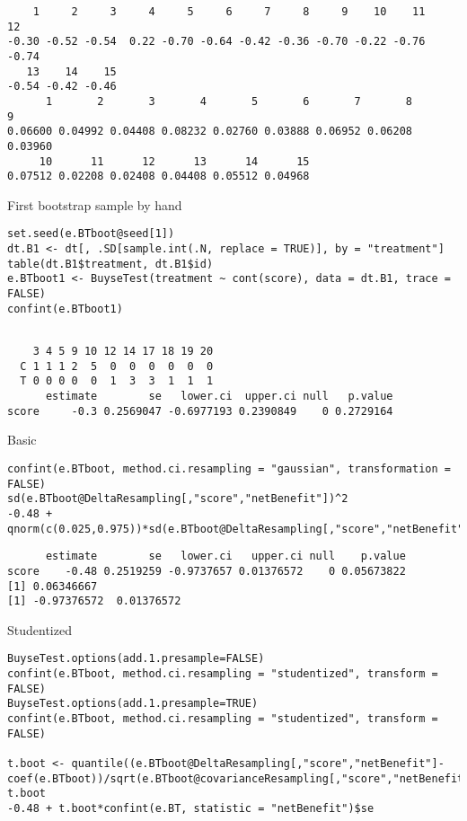 \documentclass[12pt]{article}
\begin{document}
\begin{verbatim}
    1     2     3     4     5     6     7     8     9    10    11    12 
-0.30 -0.52 -0.54  0.22 -0.70 -0.64 -0.42 -0.36 -0.70 -0.22 -0.76 -0.74 
   13    14    15 
-0.54 -0.42 -0.46
      1       2       3       4       5       6       7       8       9 
0.06600 0.04992 0.04408 0.08232 0.02760 0.03888 0.06952 0.06208 0.03960 
     10      11      12      13      14      15 
0.07512 0.02208 0.02408 0.04408 0.05512 0.04968
\end{verbatim}


First bootstrap sample by hand
\lstset{language=r,label= ,caption= ,captionpos=b,numbers=none}
\begin{lstlisting}
set.seed(e.BTboot@seed[1])
dt.B1 <- dt[, .SD[sample.int(.N, replace = TRUE)], by = "treatment"]
table(dt.B1$treatment, dt.B1$id)
e.BTboot1 <- BuyseTest(treatment ~ cont(score), data = dt.B1, trace = FALSE)
confint(e.BTboot1)
\end{lstlisting}

\begin{verbatim}
   
    3 4 5 9 10 12 14 17 18 19 20
  C 1 1 1 2  5  0  0  0  0  0  0
  T 0 0 0 0  0  1  3  3  1  1  1
      estimate        se   lower.ci  upper.ci null   p.value
score     -0.3 0.2569047 -0.6977193 0.2390849    0 0.2729164
\end{verbatim}


Basic
\lstset{language=r,label= ,caption= ,captionpos=b,numbers=none}
\begin{lstlisting}
confint(e.BTboot, method.ci.resampling = "gaussian", transformation = FALSE) 
sd(e.BTboot@DeltaResampling[,"score","netBenefit"])^2
-0.48 + qnorm(c(0.025,0.975))*sd(e.BTboot@DeltaResampling[,"score","netBenefit"])
\end{lstlisting}

\begin{verbatim}
      estimate        se   lower.ci   upper.ci null    p.value
score    -0.48 0.2519259 -0.9737657 0.01376572    0 0.05673822
[1] 0.06346667
[1] -0.97376572  0.01376572
\end{verbatim}


Studentized
\lstset{language=r,label= ,caption= ,captionpos=b,numbers=none}
\begin{lstlisting}
BuyseTest.options(add.1.presample=FALSE)
confint(e.BTboot, method.ci.resampling = "studentized", transform = FALSE)
BuyseTest.options(add.1.presample=TRUE)
confint(e.BTboot, method.ci.resampling = "studentized", transform = FALSE)

t.boot <- quantile((e.BTboot@DeltaResampling[,"score","netBenefit"]-coef(e.BTboot))/sqrt(e.BTboot@covarianceResampling[,"score","netBenefit"]),c(0.025,0.975))
t.boot
-0.48 + t.boot*confint(e.BT, statistic = "netBenefit")$se
\end{lstlisting}
\end{document}
